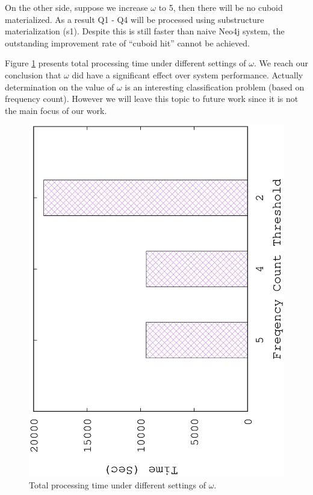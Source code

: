 On the other side, suppose we increase $\omega$ to 5, then there will be no cuboid materialized. As a result Q1 - Q4 will be processed using substructure materialization (s1). Despite this is still faster than naive Neo4j system, the outstanding improvement rate of ``cuboid hit'' cannot be achieved. 

Figure \ref{fig:omega} presents total processing time under different settings of $\omega$. We reach our conclusion that $\omega$ did have a significant effect over system performance. Actually determination on the value of $\omega$ is an interesting classification problem (based on frequency count). However we will leave this topic to future work since it is not the main focus of our work. 

\begin{figure}[H]
	\centering
	\includegraphics[scale=0.5, angle=270]{plot/omega}
	\caption{Total processing time under different settings of $\omega$.}
	\label{fig:omega}
\end{figure}


